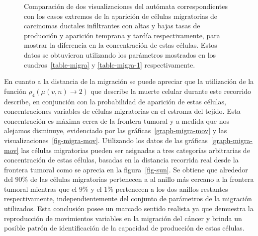 \begin{figure}[!ht]
\begin{center}
\end{center}\vspace*{-0.5cm}
\caption[Comparaci\'on de dos visualizaciones del aut\'omata correspondientes con los casos extremos mostrados del surgimiento de c\'elulas migratorias]{Comparaci\'on de dos visualizaciones del aut\'omata correspondientes con los casos extremos de la aparici\'on de c\'elulas migratorias de carcinomas ductales infiltrantes con altas y bajas tasas de producci\'on y aparici\'on temprana y tard\'ia respectivamente, para mostrar la diferencia en la concentraci\'on de estas c\'elulas. Estos datos se obtuvieron utilizando los par\'ametros mostrados en los cuadros~\ref{table-migra} y \ref{table-migra-1} respectivamente.}
\label{fig-comparisson}
\end{figure}

En cuanto a la distancia de la migraci\'on se puede apreciar que la utilizaci\'on de la funci\'on $\rho_4(\mu(v,n) \rightarrow 2)$ que describe la muerte celular durante este recorrido describe, en conjunci\'on con la probabilidad de aparici\'on de estas c\'elulas, concentraciones variables de c\'elulas migratorias en el estroma del tejido. Esta concentraci\'on es m\'axima cerca de la frontera tumoral y a medida que nos alejamos disminuye, evidenciado por las gr\'aficas~\ref{graph-migra-mov} y las visualizaciones~\ref{fig-migra-mov}. Utilizando los datos de las gr\'aficas~\ref{graph-migra-mov} las c\'elulas migratorias pueden ser asignadas a tres categor\'ias arbitrarias de concentraci\'on de estas c\'elulas, basadas en la distancia recorrida real desde la frontera tumoral como se aprecia en la figura~\ref{fig-sun}. Se obtiene que alrededor del $90\%$ de las c\'elulas migratorias pertenecen a al anillo m\'as cercano a la frontera tumoral mientras que el $9\%$ y el $1\%$ pertenecen a los dos anillos restantes respectivamente, independientemente del conjunto de par\'ametros de la migraci\'on utilizados. Esta conclusi\'on posee un marcado sentido realista ya que demuestra la reproducci\'on de movimientos variables en la migraci\'on del c\'ancer y brinda un posible patr\'on de identificaci\'on de la capacidad de producci\'on de estas c\'elulas.
